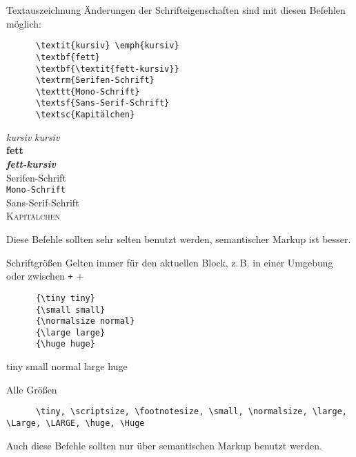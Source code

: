 \begin{frame}[fragile]{Textauszeichnung}
  Änderungen der Schrifteigenschaften sind mit diesen Befehlen möglich:
  \begin{CodeExample}{0.60}
    \begin{verbatim}
      \textit{kursiv} \emph{kursiv}
      \textbf{fett}
      \textbf{\textit{fett-kursiv}}
      \textrm{Serifen-Schrift}
      \texttt{Mono-Schrift}
      \textsf{Sans-Serif-Schrift}
      \textsc{Kapitälchen}
    \end{verbatim}
  \CodeResult
    \strut
    \textit{kursiv} \emph{kursiv} \\
    \textbf{fett} \\
    \textbf{\textit{fett-kursiv}} \\
    \textrm{Serifen-Schrift} \\
    \texttt{Mono-Schrift} \\
    \textsf{Sans-Serif-Schrift} \\
    \textsc{Kapitälchen}
  \end{CodeExample}

  \vspace{1em}
  Diese Befehle sollten sehr selten benutzt werden, semantischer Markup ist besser.
\end{frame}

\begin{frame}[fragile]{Schriftgrößen}
  Gelten immer für den aktuellen Block, z.\,B. in einer Umgebung oder zwischen \texttt+{ }+
  \begin{CodeExample}{0.48}
    \begin{verbatim}
      {\tiny tiny}
      {\small small}
      {\normalsize normal}
      {\large large}
      {\huge huge}
    \end{verbatim}
  \CodeResult
    \begin{minipage}[c][5\baselineskip][c]{\textwidth}
      {\tiny tiny}
      {\small small}
      {\normalsize normal}
      {\large large}
      {\huge huge}
    \end{minipage}
  \end{CodeExample}
  \vspace{1em}
  \begin{block}{Alle Größen}
    \begin{verbatim}
      \tiny, \scriptsize, \footnotesize, \small, \normalsize, \large, \Large, \LARGE, \huge, \Huge
    \end{verbatim}
  \end{block}
  Auch diese Befehle sollten nur über semantischen Markup benutzt werden.

\end{frame}

